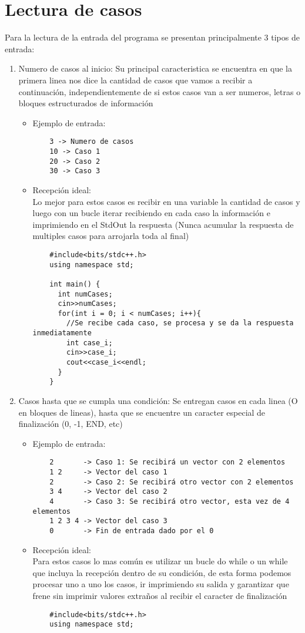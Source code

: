 \documentclass[11pt,a4paper]{article}
\begin{document}
\section{Lectura de casos}
Para la lectura de la entrada del programa se presentan principalmente 3 tipos de entrada:
\begin{enumerate} [label=\alph*.]
  \item Numero de casos al inicio: Su principal caracteristica se encuentra en que la primera linea nos dice la cantidad de casos que vamos a recibir a continuación, independientemente de si estos casos van a ser numeros, letras o bloques estructurados de información
  \begin{itemize}
    \item Ejemplo de entrada:
    \begin{verbatim}
    3 -> Numero de casos
    10 -> Caso 1
    20 -> Caso 2
    30 -> Caso 3
    \end{verbatim}
    \item Recepción ideal:\\
          Lo mejor para estos casos es recibir en una variable la cantidad de casos y luego con un bucle iterar recibiendo en cada caso la información e imprimiendo en el StdOut la respuesta (Nunca acumular la respuesta de multiples casos para arrojarla toda al final)
  \begin{lstlisting}
    #include<bits/stdc++.h>
    using namespace std;

    int main() {
      int numCases;
      cin>>numCases;
      for(int i = 0; i < numCases; i++){
        //Se recibe cada caso, se procesa y se da la respuesta inmediatamente
        int case_i;
        cin>>case_i;
        cout<<case_i<<endl;
      }
    }
  \end{lstlisting}
  \end{itemize}
  \item Casos hasta que se cumpla una condición: Se entregan casos en cada linea (O en bloques de lineas), hasta que se encuentre un caracter especial de finalización (0, -1, END, etc)
  \begin{itemize}
    \item Ejemplo de entrada:
    \begin{verbatim}
    2       -> Caso 1: Se recibirá un vector con 2 elementos
    1 2     -> Vector del caso 1
    2       -> Caso 2: Se recibirá otro vector con 2 elementos
    3 4     -> Vector del caso 2
    4       -> Caso 3: Se recibirá otro vector, esta vez de 4 elementos
    1 2 3 4 -> Vector del caso 3
    0       -> Fin de entrada dado por el 0
    \end{verbatim}
    \item Recepción ideal:\\
          Para estos casos lo mas común es utilizar un bucle do while o un while que incluya la recepción dentro de su condición, de esta forma podemos procesar uno a uno los casos, ir imprimiendo su salida y garantizar que frene sin imprimir valores extraños al recibir el caracter de finalización
  \begin{lstlisting}
    #include<bits/stdc++.h>
    using namespace std;


\end{lstlisting}
\end{itemize}
\end{enumerate}
\end{document}
